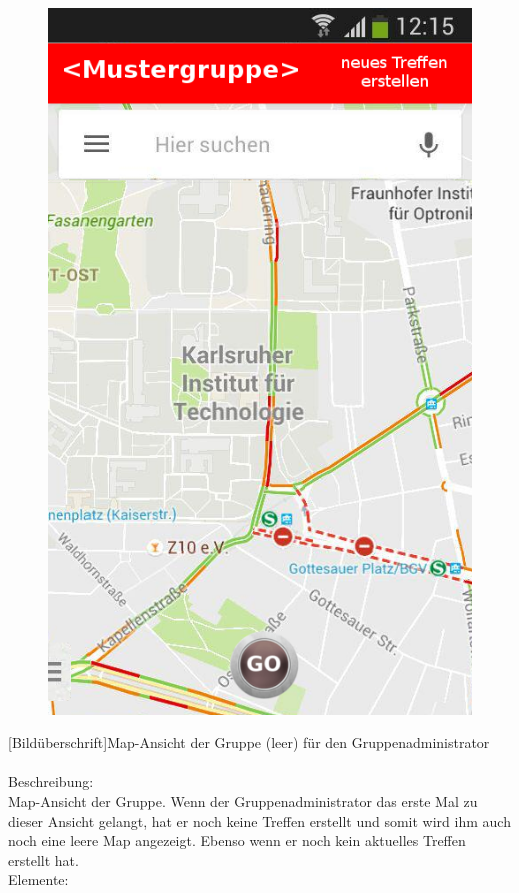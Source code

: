 \begin{figure}
	\includegraphics[scale =1]{resources/images/map_leer_Admin.png}
\end{figure}
[Bildüberschrift]Map-Ansicht der Gruppe (leer) für den Gruppenadministrator\\ \\
[Kleinüberschrift]Beschreibung:\\
Map-Ansicht der Gruppe. Wenn der Gruppenadministrator das erste Mal zu dieser Ansicht gelangt, hat er noch keine Treffen erstellt und somit wird ihm auch noch eine leere Map angezeigt. Ebenso wenn er noch kein aktuelles Treffen erstellt hat.\\
[Kleinüberschrift]Elemente:\\
